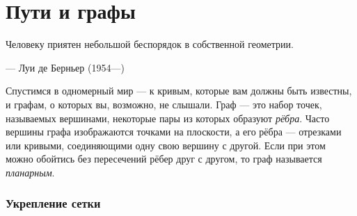 \chapter{Пути и графы}

\setlength{\epigraphwidth}{.53\textwidth}
\epigraph{Человеку приятен небольшой беспорядок в собственной геометрии.}{--- Луи де Берньер (1954---)}





Спустимся в одномерный мир --- к кривым, которые вам должны быть известны, и графам, о которых вы, возможно, не слышали.
Граф --- это набор точек, называемых вершинами, некоторые пары из которых образуют \emph{рёбра}.
Часто вершины графа изображаются точками на плоскости, а его рёбра --- отрезками или кривыми, соединяющими одну свою вершину с другой.
Если при этом можно обойтись без пересечений рёбер друг с другом, то граф называется \emph{планарным}.

\subsection*{Укрепление сетки}

